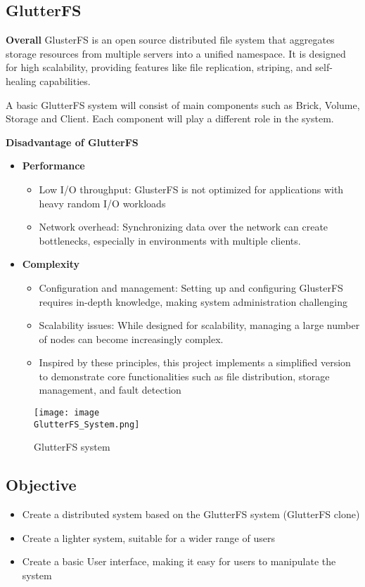 \documentclass[a4paper,12pt]{article}
\begin{document}
\subsection{GlutterFS}
\textbf{Overall}
GlusterFS is an open source distributed file system that aggregates storage resources from multiple servers into a unified namespace. It is designed for high scalability, providing features like file replication, striping, and self-healing capabilities. 

A basic GlutterFS system will consist of main components such as Brick, Volume, Storage and Client. Each component will play a different role in the system.



\textbf{Disadvantage of GlutterFS}
 \begin{itemize}
     \item\textbf{Performance}
     \begin{itemize}
         \item Low I/O throughput: GlusterFS is not optimized for applications with heavy random I/O workloads
         \item Network overhead: Synchronizing data over the network can create bottlenecks, especially in environments with multiple clients.
     \end{itemize}
     \item\textbf{Complexity}
     \begin{itemize}
         \item Configuration and management: Setting up and configuring GlusterFS requires in-depth knowledge, making system administration challenging
         \item Scalability issues: While designed for scalability, managing a large number of nodes can become increasingly complex.
         \item Inspired by these principles, this project implements a simplified version to demonstrate core functionalities such as file distribution, storage management, and fault detection
     \end{itemize}
 \end{itemize}


\begin{figure}[htbp]
    \centering
    \texttt{[image: image\\GlutterFS\_System.png]}
    \caption{GlutterFS system}
    \label{fig:enter-glutterfs}
\end{figure}



\subsection{Objective}
\begin{itemize}
    \item Create a distributed system based on the GlutterFS system (GlutterFS clone)
    \item Create a lighter system, suitable for a wider range of users
    \item Create a basic User interface, making it easy for users to manipulate the system
    
\end{itemize}
\end{document}
